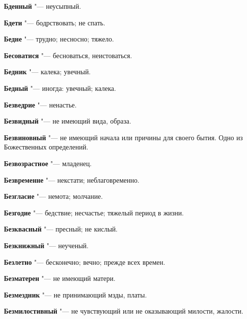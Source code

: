\begin{mymulticols}{2}
\noindent\textbf{Бденный} "--- неусыпный. 




\noindent\textbf{Бдети} "--- бодрствовать; не спать. 




\noindent\textbf{Бедне} "--- трудно; несносно; тяжело. 




\noindent\textbf{Бесоватися} "--- бесноваться, неистоваться. 




\noindent\textbf{Бедник} "--- калека; увечный. 




\noindent\textbf{Бедный} "--- иногда: увечный; калека. 




\noindent\textbf{Безведрие} "--- ненастье. 




\noindent\textbf{Безвидный} "--- не имеющий вида, образа. 




\noindent\textbf{Безвиновный} "--- не имеющий начала или причины для своего бытия. Одно из Божественных определений. 




\noindent\textbf{Безвозрастное} "--- младенец. 




\noindent\textbf{Безвременне} "--- некстати; неблаговременно. 




\noindent\textbf{Безгласие} "--- немота; молчание. 




\noindent\textbf{Безгодие} "--- бедствие; несчастье; тяжелый период в жизни. 




\noindent\textbf{Безквасный} "--- пресный; не кислый. 




\noindent\textbf{Безкнижный} "--- неученый. 




\noindent\textbf{Безлетно} "--- бесконечно; вечно; прежде всех времен. 




\noindent\textbf{Безматерен} "--- не имеющий матери. 




\noindent\textbf{Безмездник} "--- не принимающий мзды, платы. 




\noindent\textbf{Безмилостивный} "--- не чувствующий или не оказывающий милости, жалости. 





\end{mymulticols}
